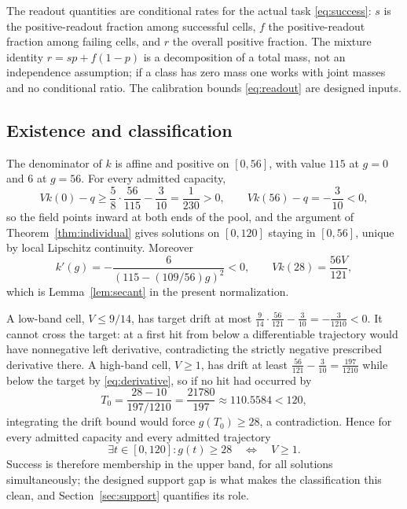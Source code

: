 \documentclass[11pt]{article}
\theoremstyle{definition}
\begin{document}
The readout quantities are conditional rates for the actual task
\eqref{eq:success}: $s$ is the positive-readout fraction among successful
cells, $f$ the positive-readout fraction among failing cells, and $r$ the
overall positive fraction. The mixture identity $r=sp+f(1-p)$ is a
decomposition of a total mass, not an independence assumption; if a class has
zero mass one works with joint masses and no conditional ratio. The calibration
bounds \eqref{eq:readout} are designed inputs.

\subsection{Existence and classification}
The denominator of $k$ is affine and positive on $[0,56]$, with value $115$ at
$g=0$ and $6$ at $g=56$. For every admitted capacity,
\[
  Vk(0)-q\ge\frac58\cdot\frac{56}{115}-\frac3{10}=\frac1{230}>0,
  \qquad Vk(56)-q=-\frac3{10}<0,
\]
so the field points inward at both ends of the pool, and the argument of
Theorem~\ref{thm:individual} gives solutions on $[0,120]$ staying in $[0,56]$,
unique by local Lipschitz continuity. Moreover
\begin{equation}\label{eq:derivative}
  k'(g)=-\frac6{(115-(109/56)g)^2}<0,\qquad Vk(28)=\frac{56V}{121},
\end{equation}
which is Lemma~\ref{lem:secant} in the present normalization.

A low-band cell, $V\le9/14$, has target drift at most
$\tfrac9{14}\cdot\tfrac{56}{121}-\tfrac3{10}=-\tfrac3{1210}<0$. It cannot
cross the target: at a first hit from below a differentiable trajectory would
have nonnegative left derivative, contradicting the strictly negative
prescribed derivative there. A high-band cell, $V\ge1$, has drift at least
$\tfrac{56}{121}-\tfrac3{10}=\tfrac{197}{1210}$ while below the target by
\eqref{eq:derivative}, so if no hit had occurred by
\begin{equation}\label{eq:T0}
  T_0=\frac{28-10}{197/1210}=\frac{21780}{197}\approx110.5584<120,
\end{equation}
integrating the drift bound would force $g(T_0)\ge28$, a contradiction. Hence
for every admitted capacity and every admitted trajectory
\begin{equation}\label{eq:classify}
  \exists t\in[0,120]:g(t)\ge28\quad\Longleftrightarrow\quad V\ge1 .
\end{equation}
Success is therefore membership in the upper band, for all solutions
simultaneously; the designed support gap is what makes the classification this
clean, and Section~\ref{sec:support} quantifies its role.
\end{document}
